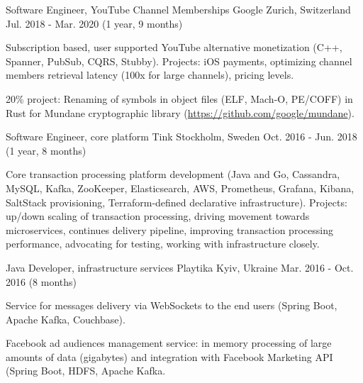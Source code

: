 \begin{cventries}
  \cventry
    {Software Engineer, YouTube Channel Memberships} %
    {Google} %
    {Zurich, Switzerland} %
    {Jul. 2018 - Mar. 2020 (1 year, 9 months)} %
    {
      \begin{cvitems}
        \item {Subscription based, user supported YouTube alternative monetization (C++, Spanner, PubSub, CQRS, Stubby). Projects: iOS payments, optimizing channel members retrieval latency (100x for large channels), pricing levels.}
        \item {20\% project: Renaming of symbols in object files (ELF, Mach-O, PE/COFF) in Rust for Mundane cryptographic library (\url{https://github.com/google/mundane}).}
      \end{cvitems}
    }

  \cventry
    {Software Engineer, core platform} %
    {Tink} %
    {Stockholm, Sweden} %
    {Oct. 2016 - Jun. 2018 (1 year, 8 months)} %
    {
      \begin{cvitems} %
        \item {Core transaction processing platform development (Java and Go, Cassandra, MySQL, Kafka, ZooKeeper, Elasticsearch, AWS, Prometheus, Grafana, Kibana, SaltStack provisioning, Terraform-defined declarative infrastructure). Projects: up/down scaling of transaction processing, driving movement towards microservices, continues delivery pipeline, improving transaction processing performance, advocating for testing, working with infrastructure closely.}
      \end{cvitems}
    }

  \cventry
    {Java Developer, infrastructure services} %
    {Playtika} %
    {Kyiv, Ukraine} %
    {Mar. 2016 - Oct. 2016 (8 months)} %
    {
      \begin{cvitems} %
        \item {Service for messages delivery via WebSockets to the end users (Spring Boot, Apache Kafka, Couchbase).}
        \item {Facebook ad audiences management service: in memory processing of large amounts of data (gigabytes) and integration with Facebook Marketing API (Spring Boot, HDFS, Apache Kafka.}
      \end{cvitems}
    }


\end{cventries}
